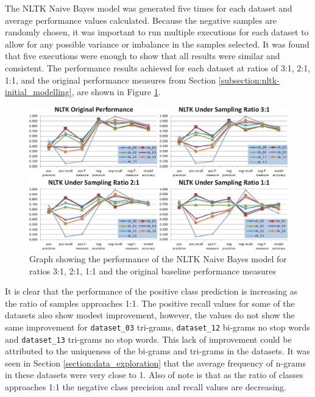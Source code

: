 The NLTK Naive Bayes model was generated five times for each dataset and average performance values calculated. Because the negative samples are randomly chosen, it was important to run multiple executions for each dataset to allow for any possible variance or imbalance in the samples selected. It was found that five executions were enough to show that all results were similar and consistent. The performance results achieved for each dataset at ratios of 3:1, 2:1, 1:1, and the original performance measures from Section \ref{subsection:nltk-initial_modelling}, are shown in Figure \ref{fig:nltk_process_chart_03}.

\begin{figure}[htbp]
	\centering
	\includegraphics[width=1\textwidth]{Figures/Chapter5/nltk_process_chart_03.jpg}
	\caption[NLTK model performance using under sampling]{Graph showing the performance of the NLTK Naive Bayes model for ratios 3:1, 2:1, 1:1 and the original baseline performance measures}
	\label{fig:nltk_process_chart_03}
\end{figure}

It is clear that the performance of the positive class prediction is increasing as the ratio of samples approaches 1:1. The positive recall values for some of the datasets also show modest improvement, however, the values do not show the same improvement for \verb|dataset_03| tri-grams, \verb|dataset_12| bi-grams no stop words and \verb|dataset_13| tri-grams no stop words. This lack of improvement could be attributed to the uniqueness of the bi-grams and tri-grams in the datasets. It was seen in Section \ref{section:data_exploration} that the average frequency of n-grams in these datasets were very close to 1. Also of note is that as the ratio of classes approaches 1:1 the negative class precision and recall values are decreasing. 

